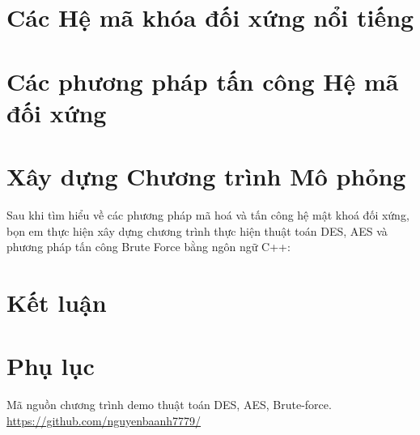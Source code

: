 \documentclass[12pt]{article}
\begin{document}
\section {Các Hệ mã khóa đối xứng nổi tiếng}



\section{Các phương pháp tấn công Hệ mã đối xứng }




\section{Xây dựng Chương trình Mô phỏng }
Sau khi tìm hiểu về các phương pháp mã hoá và tấn công hệ mật khoá đối xứng, bọn em thực hiện xây dựng chương trình thực hiện thuật toán DES, AES và phương pháp tấn công Brute Force bằng ngôn ngữ C++:

\section{Kết luận}


\printbibliography[title=Tài liệu tham khảo]

\section{Phụ lục}
\noindent Mã nguồn chương trình demo thuật toán DES, AES, Brute-force.\\
\href{https://github.com/nguyenbaanh7779/code_mat_ma?fbclid=IwAR20RJeoBfcSAayob8vxjEPxBI3zdnPd7JFRE7L9xxqbpfqzSylKG9a0eHM}{https://github.com/nguyenbaanh7779/}\\
\end{document}
